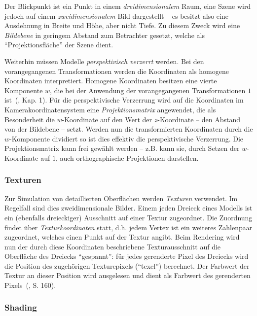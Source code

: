 \documentclass[twoside,a4paper,fleqn,12pt]{article}
\begin{document}
Der Blickpunkt ist ein Punkt in einem \emph{dreidimensionalem} Raum, eine Szene wird jedoch auf einem
\emph{zweidimensionalem} Bild dargestellt -- es besitzt also eine Ausdehnung in Breite
und Höhe, aber nicht Tiefe. Zu diesem Zweck wird eine \emph{Bildebene} in geringem Abstand zum Betrachter gesetzt,
welche als "`Projektionsfläche"' der Szene dient.

Weiterhin müssen Modelle \emph{perspektivisch verzerrt} werden. Bei den vorangegangenen Transformationen werden die Koordinaten
als homogene Koordinaten interpretiert. Homogene Koordinaten besitzen eine vierte Komponente $w$, die bei der Anwendung
der vorangegangenen Transformationen $1$ ist~(\cite{watt_de}, Kap. 1).
Für die perspektivische Verzerrung wird auf die Koordinaten im Kamerakoordinatensystem eine \emph{Projektionsmatrix} angewendet,
die als Besonderheit die $w$-Koordinate auf den Wert der $z$-Koordinate -- den Abstand von der Bildebene -- setzt.
Werden nun die transformierten Koordinaten durch die $w$-Komponente dividiert so ist dies effektiv die perspektivische Verzerrung.
Die Projektionsmatrix kann frei gewählt werden -- z.B. kann sie, durch Setzen der $w$-Koordinate auf $1$, auch orthographische
Projektionen darstellen.

\subsubsection{Texturen}

Zur Simulation von detaillierten Oberflächen werden \emph{Texturen} verwendet. Im Regelfall sind dies zweidimensionale
Bilder. Einem jeden Dreieck eines Modells ist ein (ebenfalls dreieckiger) Ausschnitt auf einer Textur zugeordnet. 
Die Zuordnung findet über \emph{Texturkoordinaten} statt, d.h. jedem Vertex ist ein weiteres Zahlenpaar zugeordnet,
welches einen Punkt auf der Textur angibt.
Beim Rendering wird nun der durch diese Koordinaten beschriebene Texturausschnitt auf die Oberfläche des Dreiecks 
"`gespannt"': für jedes gerenderte Pixel des Dreiecks wird die Position des zugehörigen Texturepixels (``texel'')
berechnet. Der Farbwert der Textur an dieser Position wird ausgelesen und dient als Farbwert des gerenderten Pixels~(\cite{watt_de}, S. 160).

\subsubsection{Shading}
\end{document}
